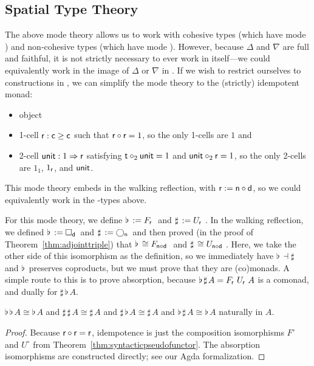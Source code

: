 \documentclass{drl-common/llncs}
\newcommand{\la}{\ensuremath{\dashv}}
\newcommand{\tc}[2]{\ensuremath{#1 \Rightarrow #2}}
\newcommand\compo[2]{\ensuremath{#1 \circ #2}}
\newcommand\comph[2]{\ensuremath{#1 \mathbin{\circ_2} #2}}
\newcommand\F[2]{\ensuremath{F_{#1} \,\, #2}}
\newcommand\U[2]{\ensuremath{U_{#1} \,\, #2}}
\newcommand\Bx[2]{\ensuremath{\Box_{#1} \, {#2}}}
\newcommand\Crc[2]{\ensuremath{\bigcirc_{#1} \, {#2}}}
\newcommand\Flat[1]{\ensuremath{\flat \, {#1}}}
\newcommand\Sharp[1]{\ensuremath{\sharp \, {#1}}}
\newcommand\iso{\cong}
\begin{document}
\subsection{Spatial Type Theory}
\label{sec:idempotent}

The above mode theory allows us to work with cohesive types (which have
mode ) and non-cohesive types (which have mode ).
However, because $\Delta$ and $\nabla$ are full and faithful, it is not
strictly necessary to ever work in  itself---we could
equivalently work in the image of $\Delta$ or $\nabla$ in .  If
we wish to restrict ourselves to constructions in , we can
simplify the mode theory to the (strictly) idempotent monad:
\begin{itemize}
\item object 
\item 1-cell $\mathsf{r} : \mathsf{c} \ge \mathsf{c}$ such that
  $\compo{\dsd{r}}{\dsd{r}} = 1$, so the only 1-cells are $1$ and 
\item 2-cell $\dsd{unit} : \tc{1}{\dsd{r}}$ satisfying $\comph{\dsd
  t}{\dsd{unit}} = 1$ and $\comph{\dsd{unit}}{\dsd{r}} = 1$, so 
  the only 2-cells are $1_1$, $1_{\mathsf{r}}$, and  $\mathsf{unit}$. 
\end{itemize}
This mode theory embeds in the walking reflection, with $\dsd{r} :=
\compo{\dsd{n}}{\dsd{d}}$, so we could equivalently work in the
-types above.

For this mode theory, we define $\Flat{} := \F{\dsd{r}}{}$ and $\Sharp{}
:= \U{\dsd{r}}{}$.  In the walking reflection, we defined $\Flat{} :=
\Bx{\dsd{d}}{}$ and $\Sharp{} := \Crc{\dsd{n}}{}$ and then proved (in
the proof of Theorem~\ref{thm:adjointtriple}) that $\Flat{} \iso
\F{\compo{\dsd n}{\dsd d}}$ and $\Sharp{} \iso \U{\compo{\dsd n}{\dsd
    d}}$. Here, we take the other side of this isomorphism as the
definition, so we immediately have $\Flat{} \la \Sharp{}$ and $\Flat{}$
preserves coproducts, but we must prove that they are (co)monads.  A
simple route to this is to prove absorption, because $\Flat{\Sharp A} =
\F{\dsd{r}}{\U{\dsd{r}}{A}}$ is a comonad, and dually for $\Sharp{\Flat
  A}$.  

\begin{theorem}
 $\Flat{\Flat A} \iso \Flat A$ and $\Sharp{\Sharp A} \iso \Sharp A$
and $\Sharp{\Flat A} \iso \Sharp{A}$ 
and $\Flat{\Sharp A} \iso \Flat{A}$ naturally in $A$.
\end{theorem}
\begin{proof}
Because $\compo{\dsd r}{\dsd r} = {\dsd r}$, idempotence is just the composition
isomorphisms $F^\circ$ and $U^\circ$ from
Theorem~\ref{thm:syntacticpseudofunctor}.  The absorption isomorphisms
are constructed directly; see our Agda formalization.
\end{proof}
\end{document}
